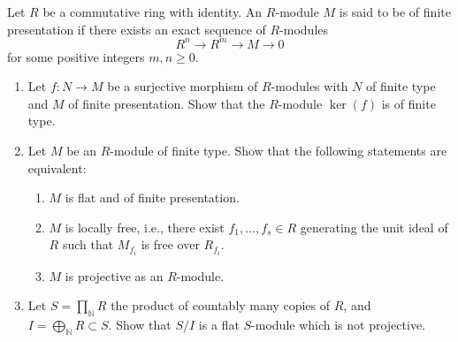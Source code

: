 \begin{exercise}
\label{algebra:2023:4}
Let $R$ be a commutative ring with identity. An $R$-module $M$ is said to be of finite presentation if there exists an exact sequence of $R$-modules
$$R^n \longrightarrow R^m \longrightarrow M \longrightarrow 0$$
for some positive integers $m, n \geq 0$.

\begin{enumerate}
\item[(1)] Let $f: N \to M$ be a surjective morphism of $R$-modules with $N$ of finite type and $M$ of finite presentation. Show that the $R$-module $\ker(f)$ is of finite type.

\item[(2)] Let $M$ be an $R$-module of finite type. Show that the following statements are equivalent:
\begin{enumerate}
\item[(a)] $M$ is flat and of finite presentation.
\item[(b)] $M$ is locally free, i.e., there exist $f_1, \dots, f_s \in R$ generating the unit ideal of $R$ such that $M_{f_i}$ is free over $R_{f_i}$.
\item[(c)] $M$ is projective as an $R$-module.
\end{enumerate}

\item[(3)] Let $S = \prod_{\mathbb{N}} R$ the product of countably many copies of $R$, and $I = \bigoplus_{\mathbb{N}} R \subset S$. Show that $S/I$ is a flat $S$-module which is not projective.
\end{enumerate}
\end{exercise}

